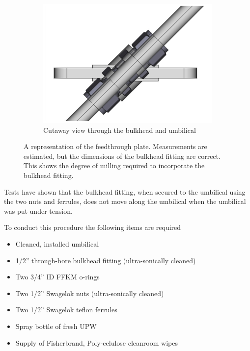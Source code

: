\documentclass[11pt]{article}
\begin{document}
\begin{figure}
\begin{center}
\begin{subfigure}{0.3\textwidth}
      \includegraphics[width=\textwidth]{UmbilicalFeedthroughCutaway.pdf}
      \caption{Cutaway view through the bulkhead and umbilical}
      \label{fig:UFCut}
    \end{subfigure}
  \end{center}
  \caption{A representation of the feedthrough plate. Measurements are estimated, but the dimensions of the bulkhead fitting are correct. This shows the degree of milling required to incorporate the bulkhead fitting.}
  \label{fig:UmbilicalFeedthrough}
\end{figure}

Tests have shown that the bulkhead fitting, when secured to the
umbilical using the two nuts and ferrules, does not move along the
umbilical when the umbilical was put under tension. 

To conduct this procedure the following items are required
\begin{itemize}[label=$\square$]
\item Cleaned, installed umbilical
\item 1/2'' through-bore bulkhead fitting (ultra-sonically cleaned)
\item Two 3/4'' ID FFKM o-rings
\item Two 1/2'' Swagelok nuts (ultra-sonically cleaned)
\item Two 1/2'' Swagelok teflon ferrules
\item Spray bottle of fresh UPW
\item Supply of Fisherbrand, Poly-celulose cleanroom wipes
\end{itemize}
\end{document}
